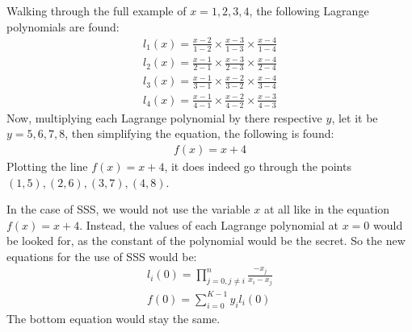 \documentclass[15pt]{article}
\begin{document}
\begin{flushleft}
Walking through the full example of $x=1,2,3,4$, the following Lagrange
polynomials are found:
\begin{align*}
 l_1(x) = \frac{x-2}{1-2} \times \frac{x-3}{1-3} \times \frac{x-4}{1-4} \\
 l_2(x) = \frac{x-1}{2-1} \times \frac{x-3}{2-3} \times \frac{x-4}{2-4} \\
 l_3(x) = \frac{x-1}{3-1} \times \frac{x-2}{3-2} \times \frac{x-4}{3-4} \\
 l_4(x) = \frac{x-1}{4-1} \times \frac{x-2}{4-2} \times \frac{x-3}{4-3}
\end{align*}
Now, multiplying each Lagrange polynomial by there respective $y$, let it be
$y=5,6,7,8$, then simplifying the equation, the following is found:
\begin{align*}
 f(x) = x + 4
\end{align*}
Plotting the line $f(x)=x+4$, it does indeed go through the points $(1,5),(2,6),
(3,7),(4,8)$.
\begin{center}
\end{center}

In the case of SSS, we would not use the variable $x$ at all like in the
equation $f(x)=x+4$. Instead, the values of each Lagrange polynomial at $x=0$
would be looked for, as the constant of the polynomial would be the secret. So
the new equations for the use of SSS would be:
\begin{align*}
 l_{i}(0) = \prod_{j=0, j\neq i}^{n} \frac{-x_{j}}{x_{i}-x_{j}} \\
 f(0) = \sum_{i=0}^{K-1} y_{i}l_{i}(0)
\end{align*}
The bottom equation would stay the same.


\end{flushleft}
\end{document}
